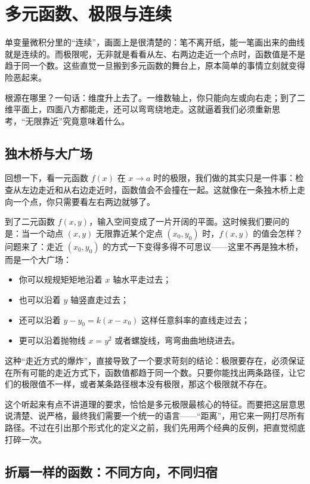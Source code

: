 \section{多元函数、极限与连续}
\label{sec:02-Calculus/06-Multivariable-Calculus/01}

单变量微积分里的``连续''，画面上是很清楚的：笔不离开纸，能一笔画出来的曲线就是连续的。而极限呢，无非就是看看从左、右两边走近一个点时，函数值是不是趋于同一个数。这些直觉一旦搬到多元函数的舞台上，原本简单的事情立刻就变得险恶起来。

根源在哪里？一句话：维度升上去了。一维数轴上，你只能向左或向右走；到了二维平面上，四面八方都能走，还可以弯弯绕地走。这就逼着我们必须重新思考，``无限靠近''究竟意味着什么。

\subsection{独木桥与大广场}

回想一下，看一元函数 \(f(x)\) 在 \(x\to a\) 时的极限，我们做的其实只是一件事：检查从左边走近和从右边走近时，函数值会不会撞在一起。这就像在一条独木桥上走向一个点，你只需要看左右两边就够了。

到了二元函数 \(f(x,y)\)，输入空间变成了一片开阔的平面。这时候我们要问的是：当一个动点 \((x,y)\) 无限靠近某个定点 \((x_0,y_0)\) 时，\(f(x,y)\) 的值会怎样？  
问题来了：走近 \((x_0,y_0)\) 的方式一下变得多得不可思议——这里不再是独木桥，而是一个大广场：

\begin{itemize}
    \item 你可以规规矩矩地沿着 \(x\) 轴水平走过去；
    \item 也可以沿着 \(y\) 轴竖直走过去；
    \item 还可以沿着 \(y-y_0 = k(x-x_0)\) 这样任意斜率的直线走过去；
    \item 更可以沿着抛物线 \(x = y^2\) 或者螺旋线，弯弯曲曲地绕进去。
\end{itemize}

这种``走近方式的爆炸''，直接导致了一个要求苛刻的结论：极限要存在，必须保证在所有可能的走近方式下，函数值都趋于同一个数。只要你能找出两条路径，让它们的极限值不一样，或者某条路径根本没有极限，那这个极限就不存在。

这个听起来有点不讲道理的要求，恰恰是多元极限最核心的特征。而要把这层意思说清楚、说严格，最终我们需要一个统一的语言——``距离''，用它来一网打尽所有路径。不过在引出那个形式化的定义之前，我们先用两个经典的反例，把直觉彻底打碎一次。

\subsection{折扇一样的函数：不同方向，不同归宿}

